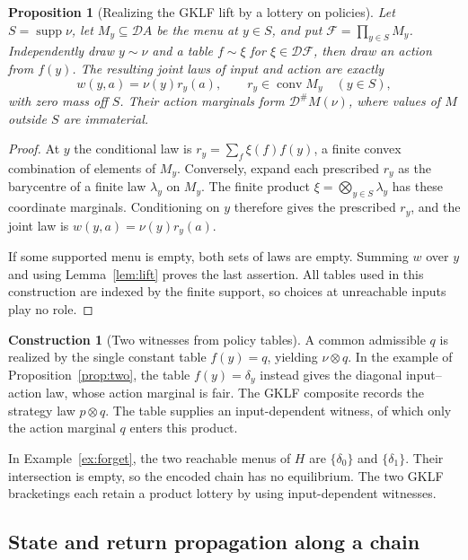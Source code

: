 \documentclass[11pt,a4paper]{article}
\newtheorem{proposition}[theorem]{Proposition}
\theoremstyle{definition}
\newtheorem*{construction}{Construction}
\newcommand{\D}{\mathcal D}
\newcommand{\conv}{\operatorname{conv}}
\newcommand{\supp}{\operatorname{supp}}
\begin{document}
\begin{proposition}[Realizing the GKLF lift by a lottery on policies]\label{prop:policy}
    Let $S=\supp\nu$, let $M_y\subseteq\D A$ be the menu at $y\in S$, and put $\mathcal F=\prod_{y\in S}M_y$. Independently draw $y\sim\nu$ and a table $f\sim\xi$ for $\xi\in\D\mathcal F$, then draw an action from $f(y)$. The resulting joint laws of input and action are exactly
    \[
        w(y,a)=\nu(y)r_y(a),\qquad r_y\in\conv M_y\quad(y\in S),
    \]
    with zero mass off $S$. Their action marginals form $\D^\#M(\nu)$, where values of $M$ outside $S$ are immaterial.
\end{proposition}
\begin{proof}
    At $y$ the conditional law is $r_y=\sum_f\xi(f)f(y)$, a finite convex combination of elements of $M_y$. Conversely, expand each prescribed $r_y$ as the barycentre of a finite law $\lambda_y$ on $M_y$. The finite product $\xi=\bigotimes_{y\in S}\lambda_y$ has these coordinate marginals. Conditioning on $y$ therefore gives the prescribed $r_y$, and the joint law is $w(y,a)=\nu(y)r_y(a)$.

    If some supported menu is empty, both sets of laws are empty. Summing $w$ over $y$ and using Lemma~\ref{lem:lift} proves the last assertion. All tables used in this construction are indexed by the finite support, so choices at unreachable inputs play no role.
\end{proof}

\begin{construction}[Two witnesses from policy tables]
    A common admissible $q$ is realized by the single constant table $f(y)=q$, yielding $\nu\otimes q$. In the example of Proposition~\ref{prop:two}, the table $f(y)=\delta_y$ instead gives the diagonal input--action law, whose action marginal is fair. The GKLF composite records the strategy law $p\otimes q$. The table supplies an input-dependent witness, of which only the action marginal $q$ enters this product.
\end{construction}

In Example~\ref{ex:forget}, the two reachable menus of $H$ are $\{\delta_0\}$ and $\{\delta_1\}$. Their intersection is empty, so the encoded chain has no equilibrium. The two GKLF bracketings each retain a product lottery by using input-dependent witnesses.

\subsection{State and return propagation along a chain}
\end{document}
